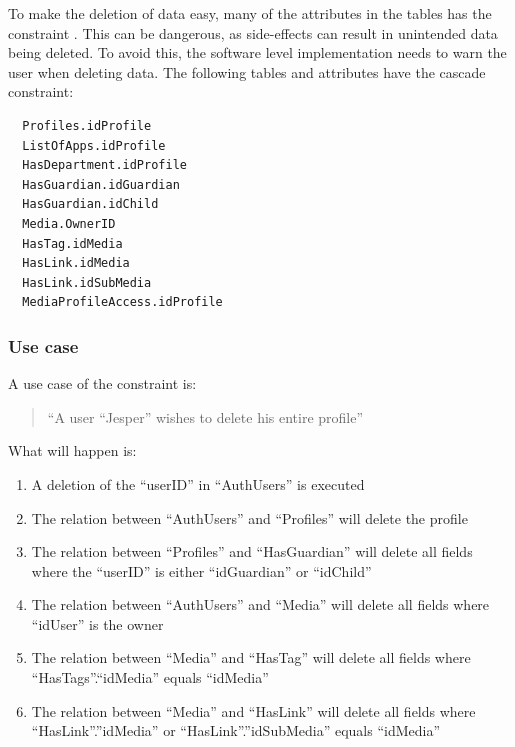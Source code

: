 To make the deletion of data easy, many of the attributes in the tables has the constraint . This can be dangerous, as side-effects can result in unintended data being deleted. To avoid this, the software level implementation needs to warn the user when deleting data. The following tables and attributes have the cascade constraint: 
\begin{verbatim}
  Profiles.idProfile
  ListOfApps.idProfile
  HasDepartment.idProfile
  HasGuardian.idGuardian 
  HasGuardian.idChild 
  Media.OwnerID 
  HasTag.idMedia 
  HasLink.idMedia 
  HasLink.idSubMedia
  MediaProfileAccess.idProfile
\end{verbatim}

\subsubsection*{Use case}
 A use case of the constraint is:
\begin{quotation}
``A user ``Jesper'' wishes to delete his entire profile''
\end{quotation}
What will happen is:
\begin{enumerate}
	\item A deletion of the ``userID'' in ``AuthUsers'' is executed
	\item The relation between ``AuthUsers'' and ``Profiles'' will delete the profile
	\item The relation between ``Profiles'' and ``HasGuardian'' will delete all fields where the ``userID'' is either ``idGuardian'' or ``idChild''
	\item The relation between ``AuthUsers'' and ``Media'' will delete all fields where ``idUser'' is the owner
	\item The relation between ``Media'' and ``HasTag'' will delete all fields where ``HasTags''.``idMedia'' equals ``idMedia''
	\item The relation between ``Media'' and ``HasLink'' will delete all fields where ``HasLink''.''idMedia'' or ``HasLink''.''idSubMedia'' equals ``idMedia''
\end{enumerate}

